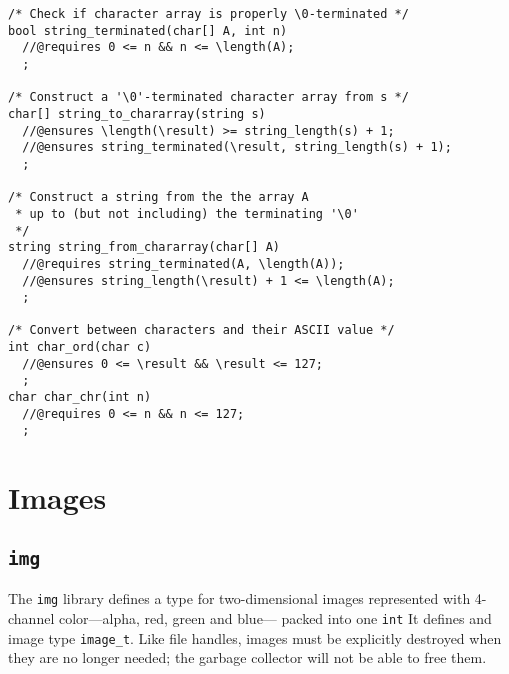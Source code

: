 \documentclass[11pt]{article}
\begin{document}
\begin{small}
\begin{verbatim}
/* Check if character array is properly \0-terminated */
bool string_terminated(char[] A, int n)
  //@requires 0 <= n && n <= \length(A);
  ;

/* Construct a '\0'-terminated character array from s */
char[] string_to_chararray(string s)
  //@ensures \length(\result) >= string_length(s) + 1;
  //@ensures string_terminated(\result, string_length(s) + 1);
  ;

/* Construct a string from the the array A
 * up to (but not including) the terminating '\0'
 */
string string_from_chararray(char[] A)
  //@requires string_terminated(A, \length(A));
  //@ensures string_length(\result) + 1 <= \length(A);
  ;

/* Convert between characters and their ASCII value */
int char_ord(char c)
  //@ensures 0 <= \result && \result <= 127;
  ;
char char_chr(int n)
  //@requires 0 <= n && n <= 127;
  ;
\end{verbatim}
\end{small}

\section{Images}

\subsection{\tt img}

The \verb'img' library defines a type for two-dimensional images
represented with 4-channel color---alpha, red, green and blue---
packed into one \verb'int'  It defines and image type \verb'image_t'.
Like file handles, images must be explicitly destroyed when they
are no longer needed; the garbage collector will not be able to
free them.
\end{document}

